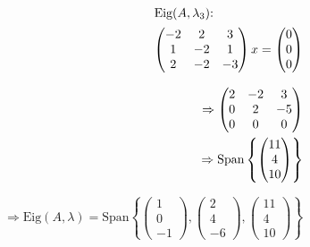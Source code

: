 \documentclass{HM}
\newcommand{\Eig}{\text{Eig}}
\newcommand{\Span}{\text{Span}}
\begin{document}
\begin{enumerate}
\begin{minipage}{.33\textwidth}
	\end{minipage}
	\begin{minipage}{.33\textwidth}
		\begin{align*}
		\intertext{$\Eig(A, \lambda_3)$:}
		\begin{pmatrix}
			-2&2&3\\
			1&-2&1\\
			2&-2&-3
		\end{pmatrix}x=\begin{pmatrix}
			0\\0\\0
		\end{pmatrix}\\
		\intertext{}
		\Rightarrow\begin{pmatrix}
			2&-2&3\\
			0&2&-5\\
			0&0&0
		\end{pmatrix}\\
		\Rightarrow\Span\left\lbrace\begin{pmatrix}
			11\\
			4\\
			10
		\end{pmatrix}\right\rbrace
		\end{align*}
		\end{minipage}
		$\Rightarrow \Eig(A,\lambda)=\Span\left\lbrace\begin{pmatrix}
			1\\0\\-1
		\end{pmatrix},\begin{pmatrix}
			2\\4\\-6
		\end{pmatrix},\begin{pmatrix}
			11\\4\\10
		\end{pmatrix}\right\rbrace$
		

\end{enumerate}
\end{document}

